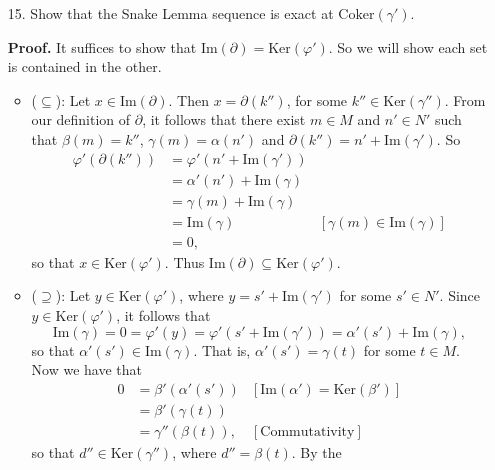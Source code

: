 \documentclass[9pt]{article}
\newcommand{\Ker}{\text{Ker}}
\newcommand{\Coker}{\text{Coker}}
\newcommand{\im}{\text{Im}}
\begin{document}
\begin{enumerate}
   \item[15.]  Show that the Snake Lemma sequence is exact at $\Coker(\gamma')$.

      \textbf{Proof.} It suffices to show that
      $\im(\partial) = \Ker(\varphi')$. So we will show each set is
      contained in the other.
      \begin{itemize}
         \item ($\subseteq$): Let $x \in \im(\partial)$. Then
               $x = \partial(k'')$, for some $k'' \in \Ker(\gamma'')$. From our
               definition of $\partial$, it follows that there exist $m \in M$
               and $n' \in N'$ such that $\beta(m) = k''$,
               $\gamma(m) = \alpha(n')$ and $\partial(k'') =n' + \im(\gamma')$.
               So
               \begin{align*}
                  \varphi'(\partial(k'')) &= \varphi'(n'+\im(\gamma')) \\
                     &= \alpha'(n') + \im(\gamma) \\
                     &= \gamma(m) + \im(\gamma) \\
                     &= \im(\gamma) &[\gamma(m) \in \im(\gamma)] \\
                     &= 0,
               \end{align*}
               so that $x \in \Ker(\varphi')$. Thus 
               $\im(\partial) \subseteq \Ker(\varphi')$.
         \item ($\supseteq$): Let $y \in \Ker(\varphi')$, where
               $y = s' + \im(\gamma')$ for some $s' \in N'$. Since
               $y \in \Ker(\varphi')$, it follows that
               $$\im(\gamma) = 0 = \varphi'(y) = \varphi'(s' + \im(\gamma')) =
                 \alpha'(s') + \im(\gamma),$$
               so that $\alpha'(s') \in \im(\gamma)$. That is,
               $\alpha'(s') = \gamma(t)$ for some $t \in M$. Now we have that
               \begin{align*}
                  0 &= \beta'(\alpha'(s')) &[\im(\alpha')=\Ker(\beta')] \\
                    &= \beta'(\gamma(t)) \\
                    &= \gamma''(\beta(t)), &[\text{Commutativity}]                    
               \end{align*}
               so that $d'' \in \Ker(\gamma'')$, where $d'' = \beta(t)$. By the

\end{itemize}
\end{enumerate}
\end{document}

